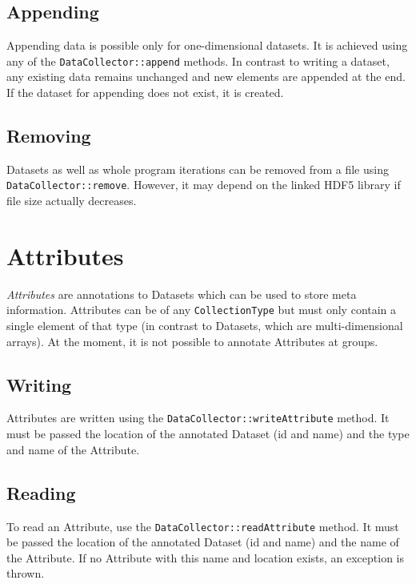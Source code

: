 \documentclass[a4paper,10pt,BCOR12mm]{report}
\newcommand{\code}[1]{\small \texttt{#1}}
\begin{document}
\subsection{Appending}

Appending data is possible only for one-dimensional datasets.
It is achieved using any of the \code{DataCollector::append} methods.
In contrast to writing a dataset, any existing data remains unchanged and
new elements are appended at the end.
If the dataset for appending does not exist, it is created.

\subsection{Removing}

Datasets as well as whole program iterations can be removed from a file using\\ \code{DataCollector::remove}.
However, it may depend on the linked HDF5 library if file size actually decreases.


\section{Attributes}

\emph{Attributes} are annotations to Datasets which can be used to store meta information.
Attributes can be of any \code{CollectionType} but must only contain a single element
of that type (in contrast to Datasets, which are multi-dimensional arrays).
At the moment, it is not possible to annotate Attributes at groups.

\subsection{Writing}

Attributes are written using the \code{DataCollector::writeAttribute} method.
It must be passed the location of the annotated Dataset (id and name) and the type and
name of the Attribute.

\subsection{Reading}

To read an Attribute, use the \code{DataCollector::readAttribute} method.
It must be passed the location of the annotated Dataset (id and name) and the
name of the Attribute. If no Attribute with this name and location exists, an
exception is thrown.
\end{document}
